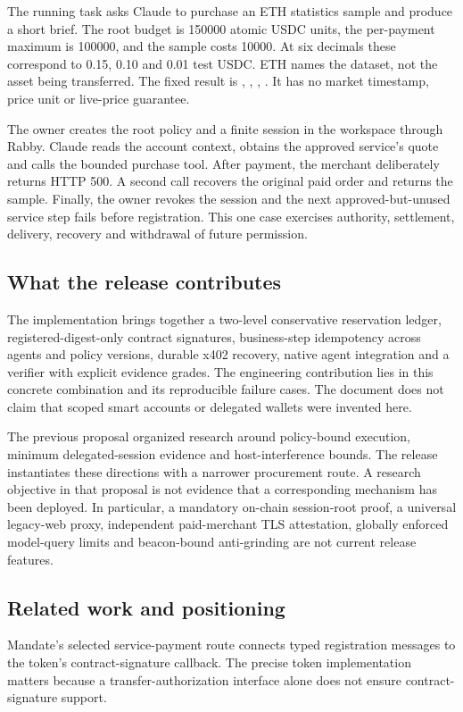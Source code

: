 The running task asks Claude to purchase an ETH statistics sample and produce a short brief. The root budget is 150000 atomic USDC units, the per-payment maximum is 100000, and the sample costs 10000. At six decimals these correspond to 0.15, 0.10 and 0.01 test USDC. ETH names the dataset, not the asset being transferred. The fixed result is , , , . It has no market timestamp, price unit or live-price guarantee.\citep{case}

The owner creates the root policy and a finite session in the workspace through Rabby. Claude reads the account context, obtains the approved service's quote and calls the bounded purchase tool. After payment, the merchant deliberately returns HTTP 500. A second call recovers the original paid order and returns the sample. Finally, the owner revokes the session and the next approved-but-unused service step fails before registration. This one case exercises authority, settlement, delivery, recovery and withdrawal of future permission.

\subsection{What the release contributes}
The implementation brings together a two-level conservative reservation ledger, registered-digest-only contract signatures, business-step idempotency across agents and policy versions, durable x402 recovery, native agent integration and a verifier with explicit evidence grades. The engineering contribution lies in this concrete combination and its reproducible failure cases. The document does not claim that scoped smart accounts or delegated wallets were invented here.

The previous proposal organized research around policy-bound execution, minimum delegated-session evidence and host-interference bounds.\citep{proposal} The release instantiates these directions with a narrower procurement route. A research objective in that proposal is not evidence that a corresponding mechanism has been deployed. In particular, a mandatory on-chain session-root proof, a universal legacy-web proxy, independent paid-merchant TLS attestation, globally enforced model-query limits and beacon-bound anti-grinding are not current release features.

\subsection{Related work and positioning}
Mandate's selected service-payment route connects typed registration messages to the token's contract-signature callback. The precise token implementation matters because a transfer-authorization interface alone does not ensure contract-signature support.\citep{erc1271,erc3009,x402compat}

